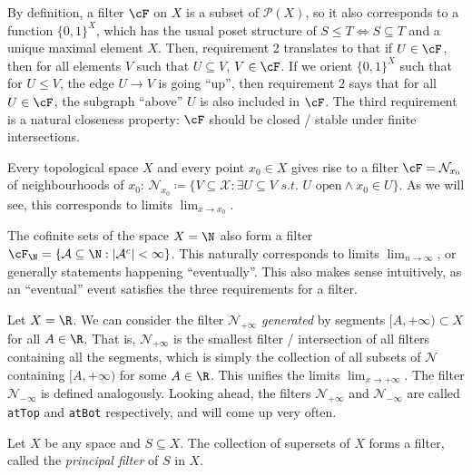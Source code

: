 By definition, a filter \(\cF\) on \(X\) is a subset of \(\mathcal{P}(X)\), so it also corresponds to a function \(\{0, 1\}^X\), which has the usual poset structure of \(S \leq T \iff S \subseteq T\) and a unique maximal element \(X\). Then, requirement 2 translates to that if \(U \in \cF\), then for all elements \(V\) such that \(U \subseteq V\), \(V \in \cF\). If we orient \(\{0, 1\}^X\) such that for \(U \leq V\), the edge \(U \to V\) is going ``up'', then requirement \(2\) says that for all \(U \in \cF\), the subgraph ``above'' \(U\) is also included in \(\cF\). The third requirement is a natural closeness property: \(\cF\) should be closed / stable under finite intersections.

\begin{example}
  Every topological space \(X\) and every point \(x_0 \in X\) gives rise to a filter \(\cF = \mathcal{N}_{x_0}\) of neighbourhoods of \(x_0\): \(\mathcal{N}_{x_0} \coloneqq \{V \subseteq \mathcal{X} : \exists U \subseteq V \,\, s.t. \,\, U \text{ open} \land x_0 \in U\}\). As we will see, this corresponds to limits \(\lim_{x \to x_0}\).
\end{example}

\begin{example}
  The cofinite sets of the space \(X = \N\) also form a filter \(\cF_{\N} = \{\mathcal{A} \subseteq \N : |\mathcal{A}^c| < \infty\}\). This naturally corresponds to limits \(\lim_{n \to \infty}\), or generally statements happening ``eventually''. This also makes sense intuitively, as an ``eventual'' event satisfies the three requirements for a filter.
\end{example}

\begin{example}
  Let \(X = \R\). We can consider the filter \(\mathcal{N}_{+\infty}\) \textit{generated} by segments \([A, +\infty) \subset X\) for all \(A \in \R\). That is, \(\mathcal{N}_{+\infty}\) is the smallest filter / intersection of all filters containing all the segments, which is simply the collection of all subsets of \(\mathcal{N}\) containing \([A, +\infty)\) for some \(A \in \R\). This unifies the limits \(\lim_{x \to +\infty}\). The filter \(\mathcal{N}_{-\infty}\) is defined analogously. Looking ahead, the filters \(\mathcal{N}_{+\infty}\) and \(\mathcal{N}_{-\infty}\) are called \texttt{atTop} and \texttt{atBot} respectively, and will come up very often.
\end{example}

\begin{example}
  Let \(X\) be any space and \(S \subseteq X\). The collection of supersets of \(X\) forms a filter, called the \textit{principal filter} of \(S\) in \(X\).
\end{example}

